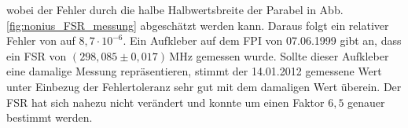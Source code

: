 wobei der Fehler durch die halbe Halbwertsbreite der Parabel in Abb.
\ref{fig:nonius_FSR_messung} abgeschätzt
werden kann. Daraus folgt ein relativer Fehler von auf $8,7\cdot10^{-6}$. Ein Aufkleber auf dem FPI von
07.06.1999 gibt an, dass ein FSR von $(298,085\pm0,017)\,$MHz gemessen wurde.
Sollte dieser Aufkleber eine damalige Messung repräsentieren, stimmt der
14.01.2012 gemessene Wert unter Einbezug der Fehlertoleranz sehr gut mit dem
damaligen Wert überein. Der FSR hat sich nahezu nicht verändert und konnte um
einen Faktor $6,5$ genauer bestimmt werden.
\begin{figure}[H]
 	\centering
\end{figure}
